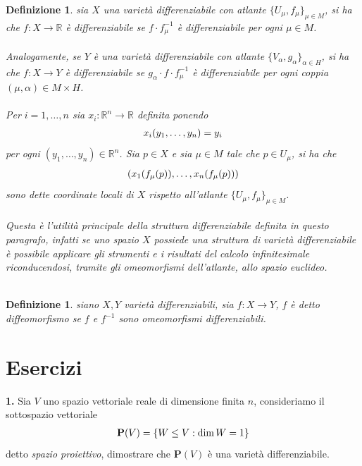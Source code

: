 \documentclass[oneside, 11pt]{amsbook}
\newcommand{\0}{{(0)}}
\newcommand{\3}{{(3)}}
\theoremstyle{colonplain}
\theoremstyle{colondefinition}
\newtheorem{defn}[thm]{Definizione}
\theoremstyle{colonremark}
\numberwithin{equation}{chapter}
\begin{document}
\begin{defn} sia $X$ una varietà differenziabile con atlante $\{ U_\mu, f_\mu \}_{\mu \in M}$, si ha che $f : X \longrightarrow \mathbb{R}$ è differenziabile se $f \cdot f^{-1}_\mu$ è differenziabile per ogni $\mu \in M$. \\ \\
Analogamente, se $Y$ è una varietà differenziabile con atlante $\{ V_\alpha, g_\alpha \}_{\alpha \in H}$, si ha che $f : X \longrightarrow Y$ è differenziabile se $g_{\alpha} \cdot f \cdot f^{-1}_\mu$ è differenziabile per ogni coppia $(\mu, \alpha) \in M \times H$. \\ \\
Per $i = 1, \dots, n$ sia $x_i : \mathbb{R}^n \longrightarrow \mathbb{R}$ definita ponendo
\begin{align}
    x_i(y_1, \dots, y_n) = y_i \notag
\end{align}
per ogni $(y_1, \dots, y_n) \in \mathbb{R}^n$. Sia $p \in X$ e sia $\mu \in M$ tale che $p \in U_\mu$, si ha che
\begin{align}
    (x_1(f_\mu(p)), \dots, x_n(f_\mu(p))) \notag
\end{align}
sono dette \textit{coordinate locali} di $X$ rispetto all'atlante $\{ U_\mu, f_\mu \}_{\mu \in M}$. \\ \\
Questa è l'utilità principale della struttura differenziabile definita in questo paragrafo, infatti se uno spazio $X$ possiede una struttura di varietà differenziabile è possibile applicare gli strumenti e i risultati del calcolo infinitesimale riconducendosi, tramite gli omeomorfismi dell'atlante, allo spazio euclideo. \\ \\
\end{defn}
\begin{defn} siano $X, Y$ varietà differenziabili, sia $f : X \longrightarrow Y$, $f$ è detto \textit{diffeomorfismo} se $f$ e $f^{-1}$ sono omeomorfismi differenziabili.

\end{defn}
\section{Esercizi}
\textbf{1.} Sia $V$ uno spazio vettoriale reale di dimensione finita $n$, consideriamo il sottospazio vettoriale
\begin{align}
    \mathbf{P}(V) = \{ W \leq V : \dim W = 1 \} \notag
\end{align}
detto \textit{spazio proiettivo}, dimostrare che $\mathbf{P}(V)$ è una varietà differenziabile. \\
\end{document}
